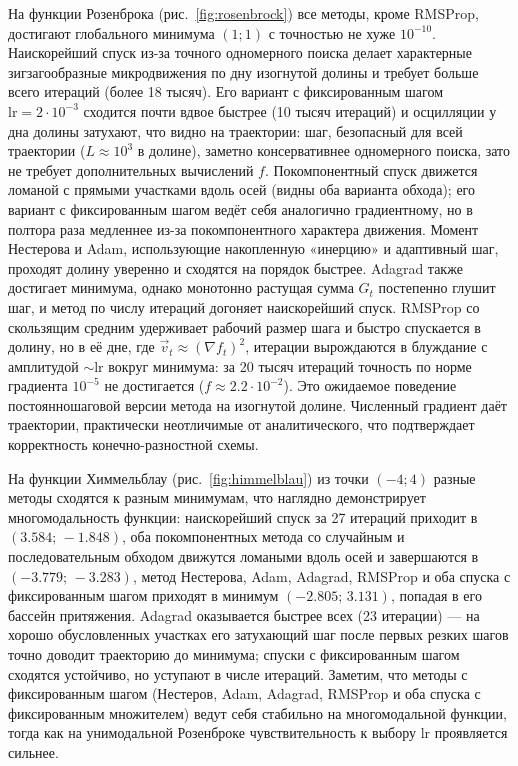 \documentclass[a4paper]{article}
\begin{document}
На функции Розенброка (рис.~\ref{fig:rosenbrock}) все методы, кроме RMSProp, достигают глобального минимума $(1; 1)$ с точностью не хуже $10^{-10}$. Наискорейший спуск из-за точного одномерного поиска делает характерные зигзагообразные микродвижения по дну изогнутой долины и требует больше всего итераций (более 18 тысяч). Его вариант с фиксированным шагом $\text{lr} = 2\cdot10^{-3}$ сходится почти вдвое быстрее (10 тысяч итераций) и осцилляции у дна долины затухают, что видно на траектории: шаг, безопасный для всей траектории ($L \approx 10^3$ в долине), заметно консервативнее одномерного поиска, зато не требует дополнительных вычислений $f$. Покомпонентный спуск движется ломаной с прямыми участками вдоль осей (видны оба варианта обхода); его вариант с фиксированным шагом ведёт себя аналогично градиентному, но в полтора раза медленнее из-за покомпонентного характера движения. Момент Нестерова и Adam, использующие накопленную «инерцию» и адаптивный шаг, проходят долину уверенно и сходятся на порядок быстрее. Adagrad также достигает минимума, однако монотонно растущая сумма $G_t$ постепенно глушит шаг, и метод по числу итераций догоняет наискорейший спуск. RMSProp со скользящим средним удерживает рабочий размер шага и быстро спускается в долину, но в её дне, где $\vec{v}_t \approx (\nabla f_t)^2$, итерации вырождаются в блуждание с амплитудой $\sim \text{lr}$ вокруг минимума: за 20 тысяч итераций точность по норме градиента $10^{-5}$ не достигается ($f \approx 2.2\cdot10^{-2}$). Это ожидаемое поведение постоянношаговой версии метода на изогнутой долине. Численный градиент даёт траектории, практически неотличимые от аналитического, что подтверждает корректность конечно-разностной схемы.

На функции Химмельблау (рис.~\ref{fig:himmelblau}) из точки $(-4; 4)$ разные методы сходятся к разным минимумам, что наглядно демонстрирует многомодальность функции: наискорейший спуск за 27 итераций приходит в $(3.584;\, -1.848)$, оба покомпонентных метода со случайным и последовательным обходом движутся ломаными вдоль осей и завершаются в $(-3.779;\, -3.283)$, метод Нестерова, Adam, Adagrad, RMSProp и оба спуска с фиксированным шагом приходят в минимум $(-2.805;\, 3.131)$, попадая в его бассейн притяжения. Adagrad оказывается быстрее всех (23 итерации) — на хорошо обусловленных участках его затухающий шаг после первых резких шагов точно доводит траекторию до минимума; спуски с фиксированным шагом сходятся устойчиво, но уступают в числе итераций. Заметим, что методы с фиксированным шагом (Нестеров, Adam, Adagrad, RMSProp и оба спуска с фиксированным множителем) ведут себя стабильно на многомодальной функции, тогда как на унимодальной Розенброке чувствительность к выбору $\text{lr}$ проявляется сильнее.
\end{document}
